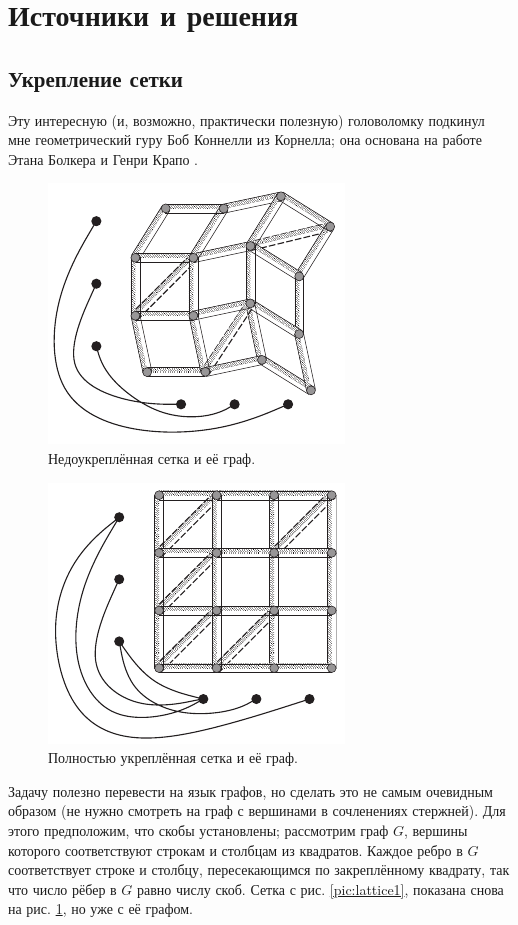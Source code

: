 \section*{Источники и решения}

\subsection*{Укрепление сетки}

Эту интересную (и, возможно, практически полезную) головоломку подкинул мне геометрический гуру Боб Коннелли из Корнелла; она основана на работе Этана Болкера и Генри Крапо \cite{bolker-crap}.


\begin{figure}[ht!]
\centering
\includegraphics[scale=1]{pics/lattice2}
\caption{Недоукреплённая сетка и её граф.}
\label{pic:lattice2}
\end{figure}

\begin{figure}[b!]
\centering
\includegraphics[scale=1]{pics/lattice3}
\caption{Полностью укреплённая сетка и её граф.}
\label{pic:lattice3}
\end{figure}

Задачу полезно перевести на язык графов, но сделать это не самым очевидным образом (не нужно смотреть на граф с вершинами в сочленениях стержней).
Для этого предположим, что скобы установлены;
рассмотрим граф $G$, вершины которого соответствуют строкам и столбцам из квадратов.
Каждое ребро в $G$ соответствует строке и столбцу, пересекающимся по закреплённому квадрату, так что число рёбер в $G$ равно числу скоб.
Сетка с рис. \ref{pic:lattice1}, показана снова на рис. \ref{pic:lattice2}, но уже с её графом.

